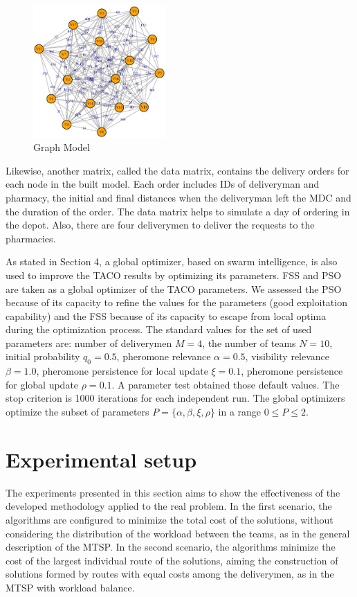 \documentclass[runningheads]{llncs}
\begin{document}
\begin{figure}
    \centering
    \includegraphics[width=0.45\textwidth]{Rplots.eps}
    \caption{Graph Model} \label{fig:2}
\end{figure}

Likewise, another matrix, called the data matrix, contains the delivery orders for each node in the built model. Each order includes IDs of deliveryman and pharmacy, the initial and final distances when the deliveryman left the MDC and the duration of the order. The data matrix helps to simulate a day of ordering in the depot. Also, there are four deliverymen to deliver the requests to the pharmacies.

As stated in Section 4, a global optimizer, based on swarm intelligence, is also used to improve the TACO results by optimizing its parameters. FSS and PSO are taken as a global optimizer of the TACO parameters. We assessed the PSO because of its capacity to refine the values for the parameters (good exploitation capability) and the FSS because of its capacity to escape from local optima during the optimization process. The standard values for the set of used parameters are: number of deliverymen \(M = 4\), the number of teams \(N = 10\), initial probability  \(q_0 = 0.5\), pheromone relevance \(\alpha = 0 .5\), visibility relevance \(\beta = 1.0\), pheromone persistence for local update \(\xi = 0.1\), pheromone persistence for global update \(\rho = 0.1\). A parameter test obtained those default values. The stop criterion is 1000 iterations for each independent run. The global optimizers optimize the subset of parameters \(P = \{\alpha,\beta,\xi,\rho\}\) in a range \(0 \leq P \leq 2\).

\section{Experimental setup}
The experiments presented in this section aims to show the effectiveness of the developed methodology applied to the real problem. In the first scenario, the algorithms are configured to minimize the total cost of the solutions, without considering the distribution of the workload between the teams, as in the general description of the MTSP. In the second scenario, the algorithms minimize the cost of the largest individual route of the solutions, aiming the construction of solutions formed by routes with equal costs among the deliverymen, as in the MTSP with workload balance.
\end{document}
